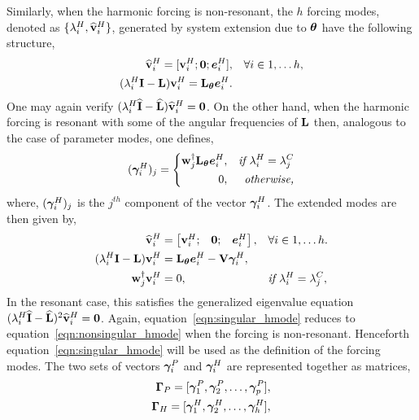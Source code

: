 Similarly, when the harmonic forcing is non-resonant, the $h$ forcing modes, denoted as $\{\lambda^{H}_{i}, \widehat{\mathbf{v}}^{H}_{i}\}$, generated by system extension due to $\boldsymbol{\theta}$ have the following structure,
\begin{subequations}
	\label{eqn:nonsingular_hmode} 
	\begin{align}
		\widehat{\mathbf{v}}^{H}_{i} = [
			\mathbf{v}^{H}_{i}; 
			\mathbf{0}; 
			\boldsymbol{e}^{H}_{i} ],
		&& \forall i \in 1,\ldots h, \\
		(\lambda^{H}_{i}\mathbf{I} - \mathbf{L})\mathbf{v}^{H}_{i} = \mathbf{L}_{\boldsymbol{\theta}}\boldsymbol{e}^{H}_{i}. &&
	\end{align}
\end{subequations}
One may again verify $(\lambda^{H}_{i}\mathbf{\widehat{I}} - \mathbf{\widehat{L}})\widehat{\mathbf{v}}^{H}_{i} = \mathbf{0}$. On the other hand, when the harmonic forcing is resonant with some of the angular frequencies of $\mathbf{L}$ then, analogous to the case of parameter modes, one defines, 
\begin{equation}
	(\boldsymbol{\gamma}^{H}_{i})_{j} =
	\left\lbrace
	\begin{split}
		\mathbf{w}^{\dagger}_{j}\mathbf{L}_{\boldsymbol{\theta}}\boldsymbol{e}^{H}_{i},  && \textit{if } \lambda^{H}_{i} = \lambda^{C}_{j} \\
		0,						 && \textit{otherwise,}	
	\end{split}\right.
\end{equation}
where, $(\boldsymbol{\gamma}^{H}_{i})_{j}$ is the $j^{th}$ component of the vector $\boldsymbol{\gamma}^{H}_{i}$. The extended modes are then given  by,
\begin{subequations}
	\label{eqn:singular_hmode}
	\begin{align}
			\widehat{\mathbf{v}}^{H}_{i} &= \begin{bmatrix}
			\mathbf{v}^{H}_{i}; &
			\mathbf{0}; &
			\boldsymbol{e}^{H}_{i}
		\end{bmatrix}, && \forall i \in 1,\ldots h. \\
		(\lambda^{H}_{i}\mathbf{I} - \mathbf{L})\mathbf{v}^{H}_{i} &= \mathbf{L}_{\boldsymbol{\theta}}\boldsymbol{e}^{H}_{i} - \mathbf{V}\boldsymbol{\gamma}^{H}_{i}, &&   \\
		\mathbf{w}^{\dagger}_{j}\mathbf{v}^{H}_{i} &= 0, && \textit{if } \lambda^{H}_{i} = \lambda^{C}_{j},
	\end{align}
\end{subequations}
In the resonant case, this satisfies the generalized eigenvalue equation $(\lambda^{H}_{i}\mathbf{\widehat{I}} - \mathbf{\widehat{L}})^{2}\widehat{\mathbf{v}}^{H}_{i} = \mathbf{0}$. 
Again, equation~\eqref{eqn:singular_hmode} reduces to equation~\eqref{eqn:nonsingular_hmode} when the forcing is non-resonant. Henceforth equation~\eqref{eqn:singular_hmode} will be used as the definition of the forcing modes.
The two sets of vectors $\boldsymbol{\gamma}^{P}_{i}$ and $\boldsymbol{\gamma}^{H}_{i}$ are represented together as matrices,
\begin{subequations}
	\begin{align}
		\mathbf{\Gamma}_{P} = 	[\boldsymbol{\gamma}^{P}_{1},\boldsymbol{\gamma}^{P}_{2},\ldots,\boldsymbol{\gamma}^{P}_{p}], \\
		\mathbf{\Gamma}_{H} = 	[\boldsymbol{\gamma}^{H}_{1},\boldsymbol{\gamma}^{H}_{2},\ldots,\boldsymbol{\gamma}^{H}_{h}], 
	\end{align}
\end{subequations}
 
